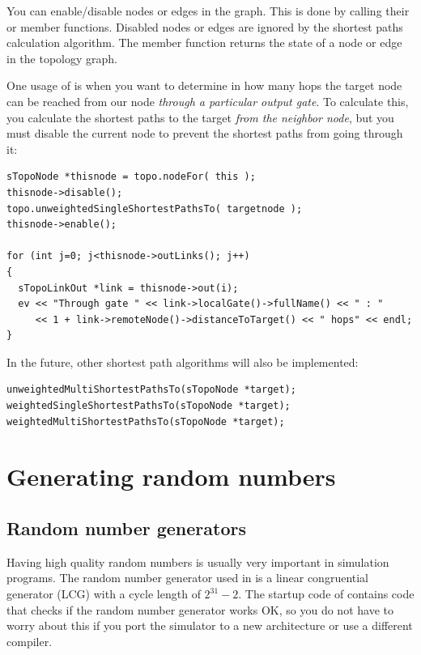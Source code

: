 You can enable/disable nodes or edges in the graph. This is done by
calling their  or  member functions.
Disabled nodes or edges are ignored by the shortest paths calculation
algorithm. The  member function returns the state of
a node or edge in the topology graph.

One usage of  is when you want to determine in how many
hops the target node can be reached from our node \textit{through
a particular output gate}. To calculate this, you calculate the
shortest paths to the target \textit{from the neighbor node}, but
you must disable the current node to prevent the shortest paths
from going through it:

\begin{verbatim}
sTopoNode *thisnode = topo.nodeFor( this );
thisnode->disable();
topo.unweightedSingleShortestPathsTo( targetnode );
thisnode->enable();

for (int j=0; j<thisnode->outLinks(); j++)
{
  sTopoLinkOut *link = thisnode->out(i);
  ev << "Through gate " << link->localGate()->fullName() << " : "
     << 1 + link->remoteNode()->distanceToTarget() << " hops" << endl;
}
\end{verbatim}

In the future, other shortest path algorithms will also be implemented:

\begin{verbatim}
unweightedMultiShortestPathsTo(sTopoNode *target);
weightedSingleShortestPathsTo(sTopoNode *target);
weightedMultiShortestPathsTo(sTopoNode *target);
\end{verbatim}



\section{Generating random numbers}

\subsection{Random number generators}

Having high quality random numbers is usually
very important in simulation programs. The random number generator
used in {\opp} is a linear congruential generator (LCG) with a cycle length of $2^{31}-2$. The
startup code of {\opp} contains code that checks if the random number
generator works OK, so you do not have to worry about this if you port
the simulator to a new architecture or use a different compiler.


